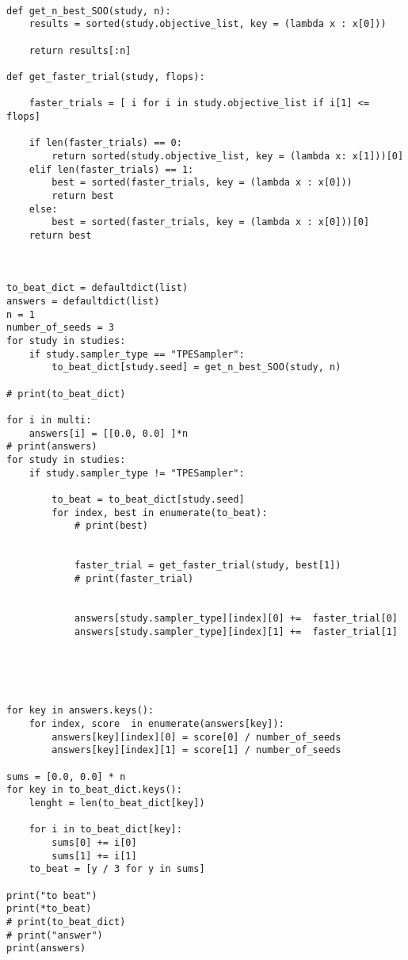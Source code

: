 \documentclass[11pt]{article}
\begin{document}
\begin{verbatim}

def get_n_best_SOO(study, n):
    results = sorted(study.objective_list, key = (lambda x : x[0]))

    return results[:n]

def get_faster_trial(study, flops):

    faster_trials = [ i for i in study.objective_list if i[1] <= flops]

    if len(faster_trials) == 0:
        return sorted(study.objective_list, key = (lambda x: x[1]))[0]
    elif len(faster_trials) == 1:
        best = sorted(faster_trials, key = (lambda x : x[0]))
        return best
    else:
        best = sorted(faster_trials, key = (lambda x : x[0]))[0]
    return best



to_beat_dict = defaultdict(list)
answers = defaultdict(list)
n = 1
number_of_seeds = 3
for study in studies:
    if study.sampler_type == "TPESampler":
        to_beat_dict[study.seed] = get_n_best_SOO(study, n)

# print(to_beat_dict)

for i in multi:
    answers[i] = [[0.0, 0.0] ]*n
# print(answers)
for study in studies:
    if study.sampler_type != "TPESampler":

        to_beat = to_beat_dict[study.seed]
        for index, best in enumerate(to_beat):
            # print(best)


            faster_trial = get_faster_trial(study, best[1])
            # print(faster_trial)


            answers[study.sampler_type][index][0] +=  faster_trial[0]
            answers[study.sampler_type][index][1] +=  faster_trial[1]





for key in answers.keys():
    for index, score  in enumerate(answers[key]):
        answers[key][index][0] = score[0] / number_of_seeds
        answers[key][index][1] = score[1] / number_of_seeds

sums = [0.0, 0.0] * n
for key in to_beat_dict.keys():
    lenght = len(to_beat_dict[key])

    for i in to_beat_dict[key]:
        sums[0] += i[0]
        sums[1] += i[1]
    to_beat = [y / 3 for y in sums]

print("to beat")
print(*to_beat)
# print(to_beat_dict)
# print("answer")
print(answers)




\end{verbatim}
\end{document}
